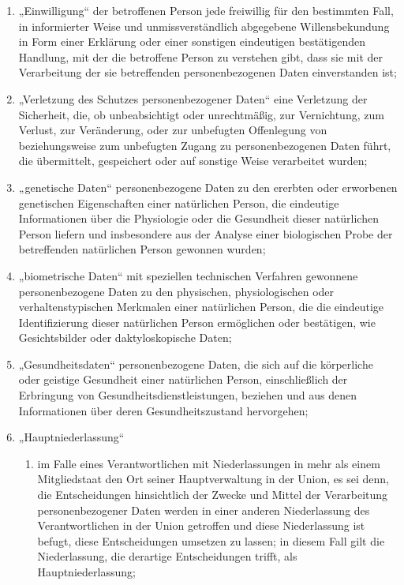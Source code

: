 \begin{enumerate}
  \item „Einwilligung“ der betroffenen Person jede freiwillig für den bestimmten Fall, in informierter Weise und
   unmissverständlich abgegebene Willensbekundung in Form einer Erklärung oder einer sonstigen eindeutigen
   bestätigenden Handlung, mit der die betroffene Person zu verstehen gibt, dass sie mit der Verarbeitung der sie
   betreffenden personenbezogenen Daten einverstanden ist;
  \label{itm:04-11}

  \item „Verletzung des Schutzes personenbezogener Daten“ eine Verletzung der Sicherheit, die, ob unbeabsichtigt oder
   unrechtmäßig, zur Vernichtung, zum Verlust, zur Veränderung, oder zur unbefugten Offenlegung von beziehungsweise zum
   unbefugten Zugang zu personenbezogenen Daten führt, die übermittelt, gespeichert oder auf sonstige Weise verarbeitet
   wurden;
  \label{itm:04-12}

  \item „genetische Daten“ personenbezogene Daten zu den ererbten oder erworbenen genetischen Eigenschaften einer
   natürlichen Person, die eindeutige Informationen über die Physiologie oder die Gesundheit dieser natürlichen Person
   liefern und insbesondere aus der Analyse einer biologischen Probe der betreffenden natürlichen Person gewonnen
   wurden;
  \label{itm:04-13}

  \item „biometrische Daten“ mit speziellen technischen Verfahren gewonnene personenbezogene Daten zu den physischen,
   physiologischen oder verhaltenstypischen Merkmalen einer natürlichen Person, die die eindeutige Identifizierung
   dieser natürlichen Person ermöglichen oder bestätigen, wie Gesichtsbilder oder daktyloskopische Daten;
  \label{itm:04-14}

  \item „Gesundheitsdaten“ personenbezogene Daten, die sich auf die körperliche oder geistige Gesundheit einer
   natürlichen Person, einschließlich der Erbringung von Gesundheitsdienstleistungen, beziehen und aus denen
   Informationen über deren Gesundheitszustand hervorgehen;
  \label{itm:04-15}

  \item „Hauptniederlassung“
  \label{itm:04-16}

  \begin{enumerate}
  
    \item im Falle eines Verantwortlichen mit Niederlassungen in mehr als einem Mitgliedstaat den Ort seiner
     Hauptverwaltung in der Union, es sei denn, die Entscheidungen hinsichtlich der Zwecke und Mittel der Verarbeitung
     personenbezogener Daten werden in einer anderen Niederlassung des Verantwortlichen in der Union getroffen und
     diese Niederlassung ist befugt, diese Entscheidungen umsetzen zu lassen; in diesem Fall gilt die Niederlassung,
     die derartige Entscheidungen trifft, als Hauptniederlassung;
    \label{itm:04-16a}


\end{enumerate}
\end{enumerate}
